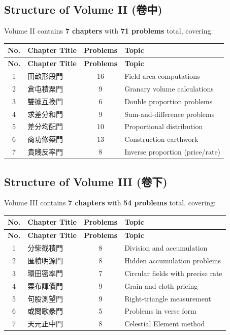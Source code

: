 \documentclass[11pt,a4paper]{article}
\begin{document}
\subsection{Structure of Volume II (卷中)}

Volume II contains \textbf{7 chapters} with \textbf{71 problems} total, covering:

\begin{center}
\begin{longtable}{|c|l|c|l|}
\hline
\textbf{No.} & \textbf{Chapter Title} & \textbf{Problems} & \textbf{Topic} \\
\hline
\endfirsthead
\hline
\textbf{No.} & \textbf{Chapter Title} & \textbf{Problems} & \textbf{Topic} \\
\hline
\endhead
1 & 田畝形段門 & 16 & Field area computations \\
2 & 倉屯積粟門 & 9 & Granary volume calculations \\
3 & 雙據互換門 & 6 & Double proportion problems \\
4 & 求差分和門 & 9 & Sum-and-difference problems \\
5 & 差分均配門 & 10 & Proportional distribution \\
6 & 商功修築門 & 13 & Construction earthwork \\
7 & 貴賤反率門 & 8 & Inverse proportion (price/rate) \\
\hline
\end{longtable}
\end{center}

\subsection{Structure of Volume III (卷下)}

Volume III contains \textbf{7 chapters} with \textbf{54 problems} total, covering:

\begin{center}
\begin{longtable}{|c|l|c|l|}
\hline
\textbf{No.} & \textbf{Chapter Title} & \textbf{Problems} & \textbf{Topic} \\
\hline
\endfirsthead
\hline
\textbf{No.} & \textbf{Chapter Title} & \textbf{Problems} & \textbf{Topic} \\
\hline
\endhead
1 & 分柴截積門 & 8 & Division and accumulation \\
2 & 匿積明源門 & 8 & Hidden accumulation problems \\
3 & 環田密率門 & 7 & Circular fields with precise rate \\
4 & 粟布諢價門 & 9 & Grain and cloth pricing \\
5 & 句股測望門 & 9 & Right-triangle measurement \\
6 & 或問歌彖門 & 5 & Problems in verse form \\
7 & 天元正中門 & 8 & Celestial Element method \\
\hline
\end{longtable}
\end{center}
\end{document}
